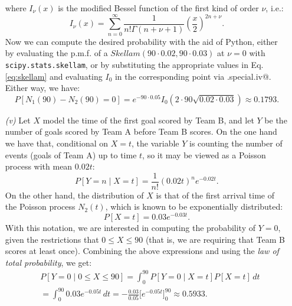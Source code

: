 \begin{enumerate}
        where $I_\nu(x)$ is the modified Bessel function of the first kind of order \( \nu \), i.e.:
\[
  I_{\nu}(x) = \sum_{n=0}^{\infty} \frac{1}{n! \Gamma(n + \nu + 1)}\left( \frac{x}{2} \right)^{2n + \nu}.
\]
Now we can compute the desired probability with the aid of Python, either by evaluating the p.m.f. of a $Skellam(90\cdot 0.02, 90\cdot 0.03)$ at $\nu=0$ with \verb|scipy.stats.skellam|, or by substituting the appropriate values in Eq. \eqref{eq:skellam} and evaluating $I_0$ in the corresponding point via \verb@scipy.special.iv@. Either way, we have:
\[
P[N_1(90)- N_2(90) = 0]=e^{-90\cdot 0.05}I_0(2\cdot 90\sqrt{0.02\cdot 0.03}) \approx 0.1793.
\]
  \item[\textit{(v)}] Let $X$ model the time of the first goal scored by Team B, and let $Y$ be the number of goals scored by Team A before Team B scores. On the one hand we have that, conditional on $X=t$, the variable $Y$ is counting the number of events (goals of Team A) up to time $t$, so it may be viewed as a Poisson process with mean $0.02t$:
  \[
  P[Y=n\mid X=t]=\frac{1}{n!}(0.02t)^n e^{-0.02t}.
  \]
  On the other hand, the distribution of $X$ is that of the first arrival time of the Poisson process $N_2(t)$, which is known to be exponentially distributed:
  \[
  P[X=t]= 0.03e^{-0.03t}.
  \]
  With this notation, we are interested in computing the probability of $Y=0$, given the restrictions that $0\leq X\leq 90$ (that is, we are requiring that Team B scores at least once). Combining the above expressions and using the \textit{law of total probability}, we get:
  \[
  \begin{aligned}
  &P[Y=0\mid0\leq X \leq 90]=\int_0^{90} P[Y=0\mid X=t]P[X=t]\, dt\\
  &=  \int_0^{90}0.03 e^{-0.05t}\, dt= -\frac{0.03}{0.05}\Big[ e^{-0.05t}\Big]_0^{90} \approx 0.5933.
\end{aligned}
  \]
\end{enumerate}
